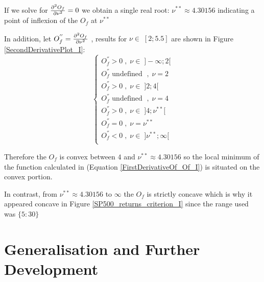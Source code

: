 If we solve for $\pdv[2]{O_f}{\nu} = 0$ we obtain a single real root: $\nu^{**} \approx 4.30156$ indicating a point of inflexion of the $O_f$ at $\nu^{**}$ 
\smallskip \par
In addition, let $O_f^{''}=\pdv[2]{O_f}{\nu}$ , results for $\nu \in \; [2;5.5]$ are shown in Figure \ref{SecondDerivativePlot_I}:
\begin{equation*}
    \begin{cases}
        O_f^{''} > 0 \; , \; \nu \in \; ]-\infty;2[ \\
        O_f^{''} \text{ undefined } \; , \; \nu = 2 \\
        O_f^{''} > 0 \; , \; \nu \in \; ]2;4[ \\
        O_f^{''} \text{ undefined } \; , \; \nu = 4 \\
        O_f^{''} > 0 \; , \; \nu \in \; ]4;\nu^{**}[ \\
        O_f^{''} = 0 \; , \; \nu = \nu^{**} \\
        O_f^{''} < 0 \; , \; \nu \in \; ]\nu^{**};\infty[ \\
    \end{cases}
\end{equation*}

Therefore the $O_f$ is convex between $4$ and $\nu^{**} \approx 4.30156$ so the local minimum of the function calculated in (Equation \ref{FirstDerivativeOf_Of_I}) is situated on the convex portion.
\smallskip\par
In contrast, from $\nu^{**} \approx 4.30156$ to $\infty$ the $O_f$ is strictly concave which is why it appeared concave in Figure \ref{SP500_returns_criterion_I} since the range used was $\{5:30\}$

\section{Generalisation and Further Development}

